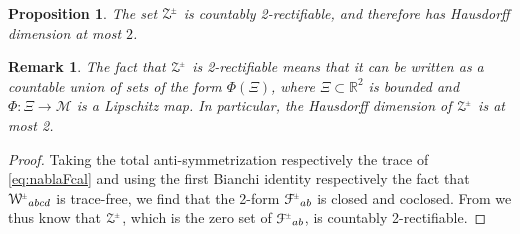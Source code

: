 \documentclass[a4paper,10pt,reqno]{amsart}
\newcommand{\Reals}{\mathbb{R}}
\newcommand{\cZ}{\mathcal{Z}}
\newcommand{\cM}{\mathcal{M}}
\newcommand{\cF}{\mathcal{F}}
\theoremstyle{plain}
\newtheorem{prop}[thm]{Proposition}
\newtheorem{remark}[thm]{Remark}
\newcommand{\PM}[1]{{{#1}^{\hspace{-.5pt}\scaleto{\pm}{3.5pt}}}}
\def\Wcal{\mathcal{W}}
\numberwithin{equation}{section}
\begin{document}
\begin{prop} \label{prop:baer}
The set $\PM{\cZ}$ is countably 2-rectifiable, and therefore has Hausdorff dimension at most $2$.
\end{prop}
\begin{remark} 
The fact that $\PM{\cZ}$ is 2-rectifiable means that it can be written as a countable union of sets of the form $\Phi(\Xi)$, where $\Xi \subset \Reals^2$ is bounded and $\Phi: \Xi \to \cM$ is a Lipschitz map. In particular, the Hausdorff dimension of $\PM{\cZ}$ is at most 2.  
%
\end{remark} 

\begin{proof}
Taking the total anti-symmetrization respectively the trace of 
\eqref{eq:nablaFcal} and using the first Bianchi identity respectively the fact that $\PM\Wcal_{abcd}$ is trace-free, we find that the 2-form $\PM\cF_{ab}$ is closed and coclosed. From \cite[Main~Theorem]{Bar-nodal-sets} we thus know that $\PM\cZ$, which is the zero set of $\PM\cF_{ab}$, is countably 2-rectifiable. 
\end{proof}
\end{document}
